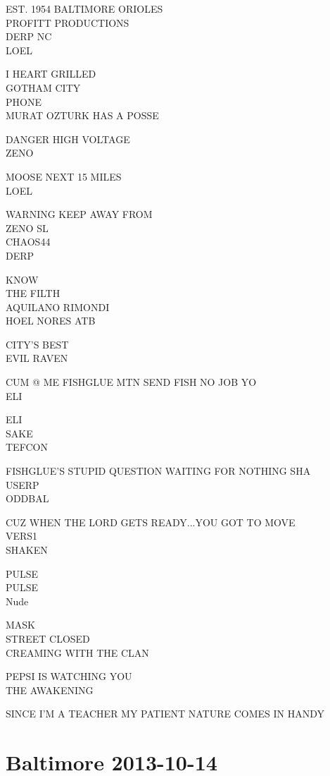 \documentclass[10pt,letterpaper]{article}
\begin{document}
EST. 1954 BALTIMORE ORIOLES\\
PROFITT PRODUCTIONS\\
DERP NC\\
LOEL

I HEART GRILLED\\
GOTHAM CITY\\
PHONE\\
MURAT OZTURK HAS A POSSE

DANGER HIGH VOLTAGE\\
ZENO

MOOSE NEXT 15 MILES\\
LOEL

WARNING KEEP AWAY FROM\\
ZENO SL\\
CHAOS44\\
DERP

KNOW\\
THE FILTH\\
AQUILANO RIMONDI\\
HOEL NORES ATB

CITY'S BEST\\
EVIL RAVEN

CUM @ ME FISHGLUE MTN SEND FISH NO JOB YO\\
ELI

ELI\\
SAKE\\
TEFCON

FISHGLUE'S STUPID QUESTION WAITING FOR NOTHING SHA\\
USERP\\
ODDBAL

CUZ WHEN THE LORD GETS READY...YOU GOT TO MOVE\\
VERS1\\
SHAKEN

PULSE\\
PULSE\\
Nude

MASK\\
STREET CLOSED\\
CREAMING WITH THE CLAN

PEPSI IS WATCHING YOU\\
THE AWAKENING

SINCE I'M A TEACHER MY PATIENT NATURE COMES IN HANDY


\section*{Baltimore 2013-10-14}
\end{document}
